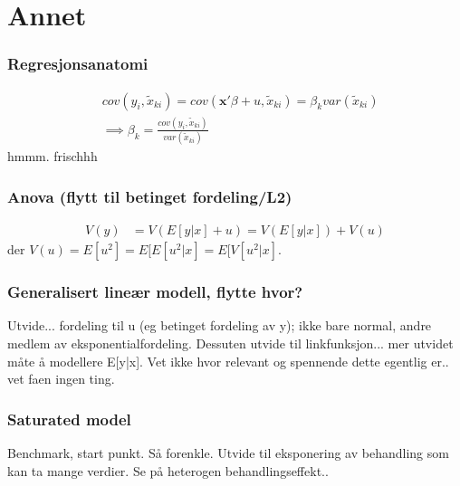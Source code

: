 \section{Annet}
\subsubsection{Regresjonsanatomi}
\begin{align}
&cov(y_i,\tilde{x}_{ki}) = cov(\mathbf{x}'\beta+u,\tilde{x}_{ki})=\beta_k var(\tilde{x}_{ki}) \\
& \implies \beta_k = \frac{cov(y_i,\tilde{x}_{ki})}{var(\tilde{x}_{ki})}
\end{align}
hmmm. frischhh
\subsubsection{Anova (flytt til betinget fordeling/L2)}
\begin{align}
V(y) &= V(E[y|x]+u) =V(E[y|x])+V(u)
\end{align}
der $V(u)=E[u^2] = E[E[u^2|x] = E[V[u^2|x]$.
\subsubsection{Generalisert lineær modell, flytte hvor?}
Utvide... fordeling til u (eg betinget fordeling av y); ikke bare normal, andre medlem av eksponentialfordeling.
Dessuten utvide til linkfunksjon... mer utvidet måte å modellere E[y|x]. Vet ikke hvor relevant og spennende dette egentlig er.. vet faen ingen ting.
\subsubsection{Saturated model}
Benchmark, start punkt. Så forenkle. Utvide til eksponering av behandling som kan ta mange verdier. Se på heterogen behandlingseffekt..
